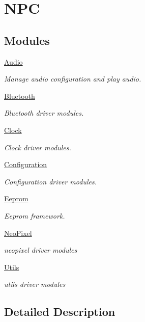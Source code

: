 \hypertarget{group___n_p_c}{}\section{N\+PC}
\label{group___n_p_c}
\subsection*{Modules}
\begin{DoxyCompactItemize}
\item 
\hyperlink{group___audio}{Audio}
\begin{DoxyCompactList}\small\item\em Manage audio configuration and play audio. \end{DoxyCompactList}\item 
\hyperlink{group___bluetooth}{Bluetooth}
\begin{DoxyCompactList}\small\item\em Bluetooth driver modules. \end{DoxyCompactList}\item 
\hyperlink{group___clock}{Clock}
\begin{DoxyCompactList}\small\item\em Clock driver modules. \end{DoxyCompactList}\item 
\hyperlink{group___configuration}{Configuration}
\begin{DoxyCompactList}\small\item\em Configuration driver modules. \end{DoxyCompactList}\item 
\hyperlink{group___eeprom}{Eeprom}
\begin{DoxyCompactList}\small\item\em Eeprom framework. \end{DoxyCompactList}\item 
\hyperlink{group___neo_pixel}{Neo\+Pixel}
\begin{DoxyCompactList}\small\item\em neopixel driver modules \end{DoxyCompactList}\item 
\hyperlink{group___utils}{Utils}
\begin{DoxyCompactList}\small\item\em utils driver modules \end{DoxyCompactList}\end{DoxyCompactItemize}


\subsection{Detailed Description}

